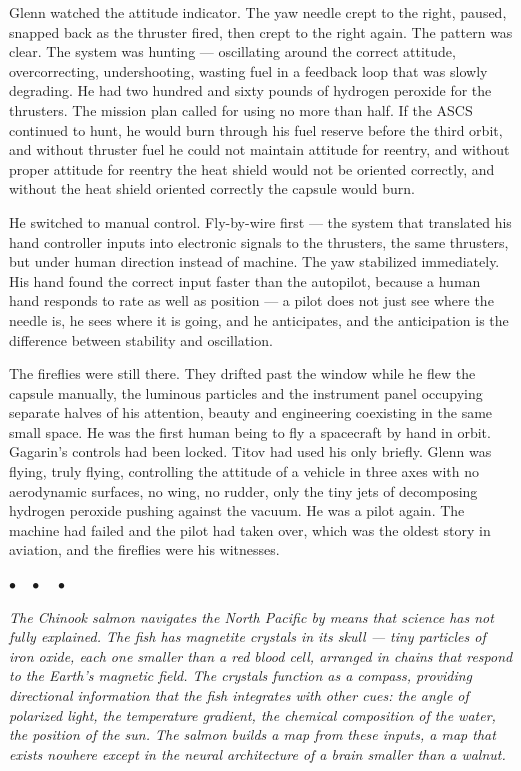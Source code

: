 \documentclass[12pt, letterpaper]{article}
\begin{document}
Glenn watched the attitude indicator. The yaw needle crept to the right, paused, snapped back as the thruster fired, then crept to the right again. The pattern was clear. The system was hunting --- oscillating around the correct attitude, overcorrecting, undershooting, wasting fuel in a feedback loop that was slowly degrading. He had two hundred and sixty pounds of hydrogen peroxide for the thrusters. The mission plan called for using no more than half. If the ASCS continued to hunt, he would burn through his fuel reserve before the third orbit, and without thruster fuel he could not maintain attitude for reentry, and without proper attitude for reentry the heat shield would not be oriented correctly, and without the heat shield oriented correctly the capsule would burn.

He switched to manual control. Fly-by-wire first --- the system that translated his hand controller inputs into electronic signals to the thrusters, the same thrusters, but under human direction instead of machine. The yaw stabilized immediately. His hand found the correct input faster than the autopilot, because a human hand responds to rate as well as position --- a pilot does not just see where the needle is, he sees where it is going, and he anticipates, and the anticipation is the difference between stability and oscillation.

The fireflies were still there. They drifted past the window while he flew the capsule manually, the luminous particles and the instrument panel occupying separate halves of his attention, beauty and engineering coexisting in the same small space. He was the first human being to fly a spacecraft by hand in orbit. Gagarin's controls had been locked. Titov had used his only briefly. Glenn was flying, truly flying, controlling the attitude of a vehicle in three axes with no aerodynamic surfaces, no wing, no rudder, only the tiny jets of decomposing hydrogen peroxide pushing against the vacuum. He was a pilot again. The machine had failed and the pilot had taken over, which was the oldest story in aviation, and the fireflies were his witnesses.

\begin{center}
$\bullet\quad\bullet\quad\bullet$
\end{center}

\emph{The Chinook salmon navigates the North Pacific by means that science has not fully explained. The fish has magnetite crystals in its skull --- tiny particles of iron oxide, each one smaller than a red blood cell, arranged in chains that respond to the Earth's magnetic field. The crystals function as a compass, providing directional information that the fish integrates with other cues: the angle of polarized light, the temperature gradient, the chemical composition of the water, the position of the sun. The salmon builds a map from these inputs, a map that exists nowhere except in the neural architecture of a brain smaller than a walnut.}
\end{document}

